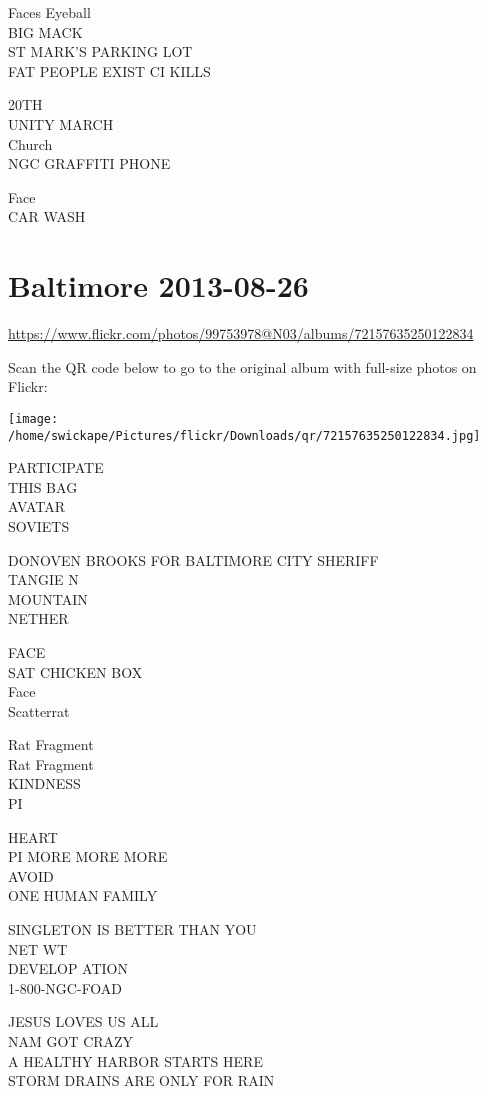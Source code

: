 \documentclass[10pt,letterpaper]{article}
\begin{document}
Faces Eyeball\\
BIG MACK\\
ST MARK'S PARKING LOT\\
FAT PEOPLE EXIST CI KILLS

20TH\\
UNITY MARCH\\
Church\\
NGC GRAFFITI PHONE

Face\\
CAR WASH


\section*{Baltimore 2013-08-26}

\url{https://www.flickr.com/photos/99753978@N03/albums/72157635250122834}

Scan the QR code below to go to the original album with full-size photos on Flickr:

\texttt{[image: /home/swickape/Pictures/flickr/Downloads/qr/72157635250122834.jpg]}


PARTICIPATE\\
THIS BAG\\
AVATAR\\
SOVIETS

DONOVEN BROOKS FOR BALTIMORE CITY SHERIFF\\
TANGIE N\\
MOUNTAIN\\
NETHER

FACE\\
SAT CHICKEN BOX\\
Face\\
Scatterrat

Rat Fragment\\
Rat Fragment\\
KINDNESS\\
PI

HEART\\
PI MORE MORE MORE\\
AVOID\\
ONE HUMAN FAMILY

SINGLETON IS BETTER THAN YOU\\
NET WT\\
DEVELOP ATION\\
1{-}800{-}NGC{-}FOAD

JESUS LOVES US ALL\\
NAM GOT CRAZY\\
A HEALTHY HARBOR STARTS HERE\\
STORM DRAINS ARE ONLY FOR RAIN
\end{document}

